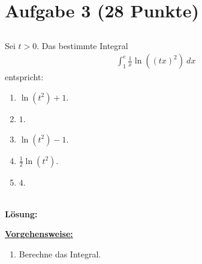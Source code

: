 \section*{Aufgabe 3 (28 Punkte)}
\vspace{0.4cm}
\subsection*{}
Sei $t > 0$. Das bestimmte Integral
\begin{align*}
	\int_1^e \frac{1}{x} \ln\left((tx)^2\right) \ dx
\end{align*}
entspricht:
\renewcommand{\labelenumi}{(\alph{enumi})}
\begin{enumerate}
	\item 
	$ \ln(t^2)  +1  $.
	\item
	$ 1 $.
	\item
	$ \ln(t^2) -1 $.
	\item 
	$\frac{1}{2} \ln(t^2)$.
	\item $4$.
\end{enumerate}
\ \\
\textbf{Lösung:}
\begin{mdframed}
\underline{\textbf{Vorgehensweise:}}
\renewcommand{\labelenumi}{\theenumi.}
\begin{enumerate}
\item Berechne das Integral.
\end{enumerate}
\end{mdframed}

